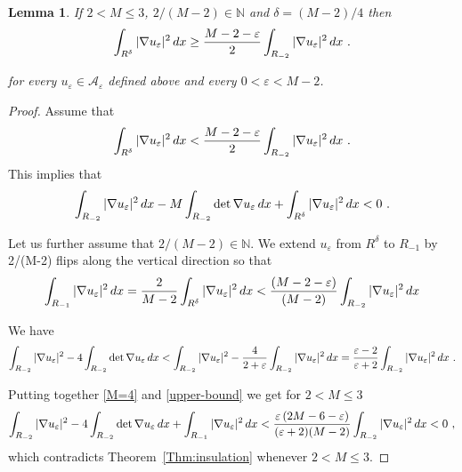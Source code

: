 \documentclass[10pt,a4paper]{amsart}
\newtheorem{lemma}{Lemma}
\newcommand{\md}{{\rm d}}
\begin{document}
\begin{lemma}\label{lowerbound}
 If $2<M\le 3$, $2/(M-2)\in \mathbb{N}$ and $\delta=(M-2)/4$
 then 
\begin{align}\label{special}
  \int_{R^\delta}|\nabla u_\varepsilon|^2 \,\md x  \ge \frac{M-2-\varepsilon}{2} \int_{R_{-2}}|\nabla u_\varepsilon|^2 \,\md x\ .
\end{align} 
 
for every $u_\varepsilon\in\mathcal{A}_\varepsilon$ defined above and 
every $0<\varepsilon<M-2$.
    
\end{lemma}

\begin{proof}
    
Assume that 
\begin{align}
  \int_{R^\delta}|\nabla u_\varepsilon|^2 \,\md x  < \frac{M-2-\varepsilon}{2} \int_{R_{-2}}|\nabla u_\varepsilon|^2 \,\md x\ .
\end{align}
This implies that 
\begin{align}
   \int_{R_{-2}}|\nabla u_\varepsilon|^2 \,\md x -M\int_{R_{-2}}\det\nabla u_\varepsilon\,\md x+ \int_{R^\delta}|\nabla u_\varepsilon|^2 \,\md x<0\ .
\end{align}

Let us further assume that $2/(M-2)\in\mathbb{N}$.
 We extend $u_\varepsilon$ from $R^\delta$ to $R_{-1}$ by 2/(M-2)  flips along the vertical direction   so that 
 \begin{align}\label{upper-bound}
     \int_{R_{-1}}|\nabla u_\varepsilon|^2 \,\md x=\frac{2}{M-2} \int_{R^\delta}|\nabla u_\varepsilon|^2 \,\md x<
     \frac{(M-2-\varepsilon)}{(M-2)}\int_{R_{-2}}|\nabla u_\varepsilon|^2 \,\md x
 \end{align}

 We have 
 \begin{align}\label{M=4}
    \int_{R_{-2}}|\nabla u_\varepsilon|^2 -4\int_{R_{-2}}\det\nabla u_\varepsilon\,\md x <  \int_{R_{-2}}|\nabla u_\varepsilon|^2 -\frac{4}{2+\varepsilon} \int_{R_{-2}}|\nabla u_\varepsilon|^2\, \md x=\frac{\varepsilon-2}{\varepsilon+2}\int_{R_{-2}}|\nabla u_\varepsilon|^2\, \md x\ .
 \end{align}

 Putting together \eqref{M=4} and \eqref{upper-bound}
we get for $2<M\le 3$
\begin{align}
  \int_{R_{-2}}|\nabla u_\varepsilon|^2 -4\int_{R_{-2}}\det\nabla u_\varepsilon\,\md x+ \int_{R_{-1}}|\nabla u_\varepsilon|^2 \,\md x< \frac{\varepsilon\,(2M-6-\varepsilon)}{(\varepsilon+2)(M-2)}\int_{R_{-2}}|\nabla u_\varepsilon|^2\, \md x <0\ ,
\end{align}
 which contradicts Theorem~\ref{Thm:insulation} whenever $2<M\le 3$. 

 \end{proof}
\end{document}
